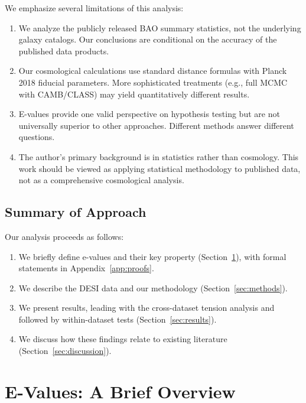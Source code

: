 \documentclass[11pt,a4paper]{article}
\begin{document}
We emphasize several limitations of this analysis:
\begin{enumerate}
    \item We analyze the publicly released BAO summary statistics, not the underlying galaxy catalogs. Our conclusions are conditional on the accuracy of the published data products.

    \item Our cosmological calculations use standard distance formulas with Planck 2018 fiducial parameters. More sophisticated treatments (e.g., full MCMC with CAMB/CLASS) may yield quantitatively different results.

    \item E-values provide one valid perspective on hypothesis testing but are not universally superior to other approaches. Different methods answer different questions.

    \item The author's primary background is in statistics rather than cosmology. This work should be viewed as applying statistical methodology to published data, not as a comprehensive cosmological analysis.
\end{enumerate}

\subsection{Summary of Approach}

Our analysis proceeds as follows:
\begin{enumerate}
    \item We briefly define e-values and their key property (Section~\ref{sec:evalues}), with formal statements in Appendix~\ref{app:proofs}.

    \item We describe the DESI data and our methodology (Section~\ref{sec:methods}).

    \item We present results, leading with the cross-dataset tension analysis and followed by within-dataset tests (Section~\ref{sec:results}).

    \item We discuss how these findings relate to existing literature (Section~\ref{sec:discussion}).
\end{enumerate}

\section{E-Values: A Brief Overview}
\label{sec:evalues}
\end{document}
